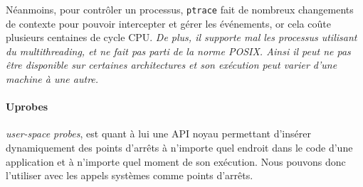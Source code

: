 Néanmoins, pour contrôler un processus, \texttt{ptrace} fait de nombreux
changements de contexte pour pouvoir intercepter et gérer les événements, or
cela coûte plusieurs centaines de cycle CPU. \textit{De plus, il supporte mal
les processus utilisant du multithreading, et ne fait pas parti de la norme
POSIX. Ainsi il peut ne pas être disponible sur certaines architectures et son
exécution peut varier d'une machine à une autre.}

\paragraph{Uprobes}\citep{AS:Interception, MARION:Interception}



\textit{user-space probes}, est quant à lui une API noyau permettant d'insérer
dynamiquement des points d'arrêts à n'importe quel endroit dans le code d'une
application et à n'importe quel moment de son exécution. Nous pouvons donc
l'utiliser avec les appels systèmes comme points d'arrêts.

